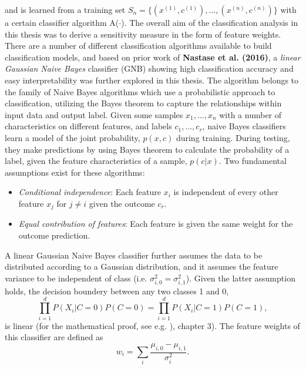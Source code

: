 \documentclass[a4paper, 12pt]{scrreprt}
\begin{document}
and is learned from a training set $S_n =\{(x^{(1)}, c^{(1)}), \ldots, (x^{(n)}, c^{(n)}) \}$ with a certain classifier algorithm A($\cdot$).
\newline
The overall aim of the classification analysis in this thesis was to derive a sensitivity measure in the form of feature weights. There are a number of different classification algorithms available to build classification models, and based on prior work of \textbf{Nastase et al. (2016)}, a \textit{linear Gaussian Naive Bayes} classifier (GNB) showing high classification accuracy and easy interpretability was further explored in this thesis. \newline
The algorithm belongs to the family of Naive Bayes algorithms which use a probabilistic approach to classification, utilizing the Bayes theorem to capture the relationships within input data and output label. Given some samples $x_1, \ldots, x_n$ with a number of characteristics on different features, and labels $c_1, \ldots, c_r$, naive Bayes classifiers learn a model of the joint probability, $p(x, c)$ during training. During testing, they make predictions by using Bayes theorem to calculate the probability of a label, given the feature characteristics of a sample, $p(c|x)$. Two fundamental assumptions exist for these algorithms: \newline 
\begin{itemize}
	\item \textit{Conditional independence}: Each feature $x_i$ is independent of every other feature $x_j$ for $j \neq i$ given the outcome $c_r$.
	\item \textit{Equal contribution of features}:  Each feature is given the same weight for the outcome prediction. 
\end{itemize} 
A linear Gaussian Naive Bayes classifier further assumes the data to be distributed according to a Gaussian distribution, and it assumes the feature variance to be independent of class (i.e. $\sigma_{i, 0}^2 = \sigma_{i, 1}^2$). Given the latter assumption holds, the decision boundery between any two classes 1 and 0,
\begin{equation}
\prod_{i=1}^{d} P(X_i |C = 0)P(C=0) = \prod_{i=1}^{d} P(X_i |C = 1)P(C=1),
\end{equation}
is linear (for the mathematical proof, see e.g. \textcite{DBLP:books/daglib/0087929}), chapter 3). The feature weights of this classifier are defined as
\begin{equation}
w_i = \sum_{i}\frac{\mu_{i, 0}-\mu_{i, 1}}{\sigma_{i}^{2}}.
\end{equation}
\end{document}
